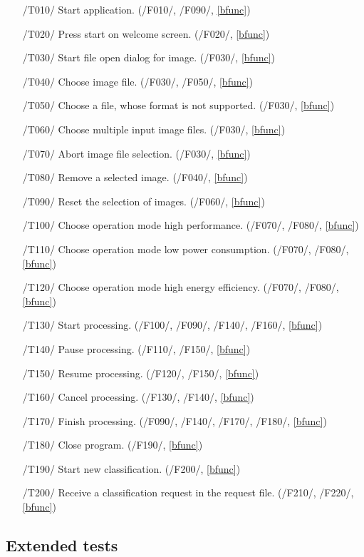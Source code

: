 \documentclass[parskip=full]{scrartcl}
\begin{document}
\begin{itemize}
	\item[/T010/] Start application. (/F010/, /F090/, \ref{bfunc})
	\item[/T020/] Press start on welcome screen. (/F020/, \ref{bfunc})
	\item[/T030/] Start file open dialog for image. (/F030/, \ref{bfunc})
	\item[/T040/] Choose image file. (/F030/, /F050/, \ref{bfunc})
	\item[/T050/] Choose a file, whose format is not supported. (/F030/, \ref{bfunc})
	\item[/T060/] Choose multiple input image files. (/F030/, \ref{bfunc})
	\item[/T070/] Abort image file selection. (/F030/, \ref{bfunc})
	\item[/T080/] Remove a selected image. (/F040/, \ref{bfunc})
	\item[/T090/] Reset the selection of images. (/F060/, \ref{bfunc})
	\item[/T100/] Choose operation mode high performance. (/F070/, /F080/, \ref{bfunc})
	\item[/T110/] Choose operation mode low power consumption. (/F070/, /F080/, \ref{bfunc})
	\item[/T120/] Choose operation mode high energy efficiency. (/F070/, /F080/, \ref{bfunc})
	\item[/T130/] Start processing. (/F100/, /F090/, /F140/, /F160/, \ref{bfunc})
	\item[/T140/] Pause processing. (/F110/, /F150/, \ref{bfunc})
	\item[/T150/] Resume processing. (/F120/, /F150/, \ref{bfunc})
	\item[/T160/] Cancel processing. (/F130/, /F140/, \ref{bfunc})
	\item[/T170/] Finish processing. (/F090/, /F140/, /F170/, /F180/, \ref{bfunc})
	\item[/T180/] Close program. (/F190/, \ref{bfunc})
	\item[/T190/] Start new classification. (/F200/, \ref{bfunc})
	\item[/T200/] Receive a classification request in the request file. (/F210/, /F220/, \ref{bfunc})
\end{itemize}

\pagebreak



\subsection {Extended tests}
\end{document}
